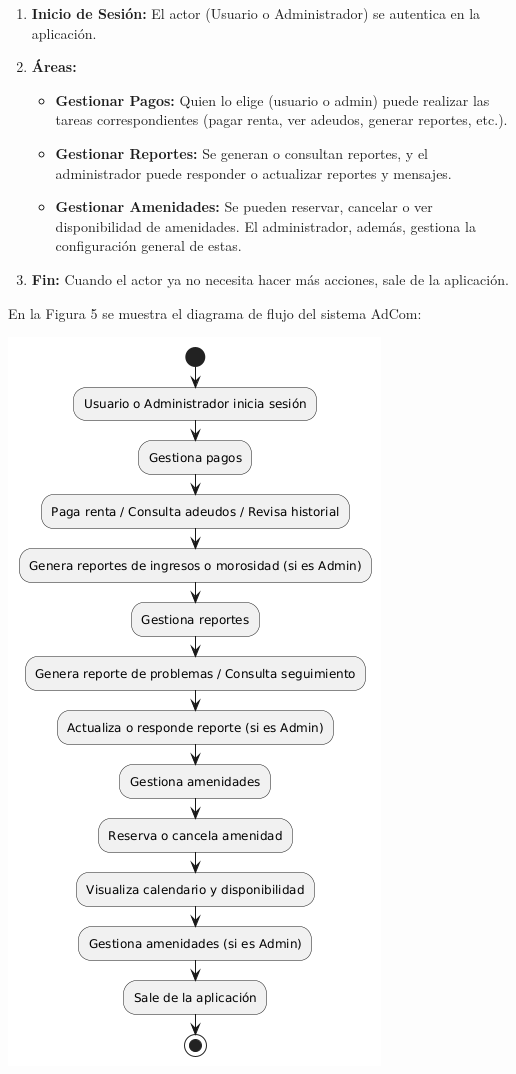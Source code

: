 \documentclass[protocolo.tex]{subfiles}
\begin{document}
\begin{enumerate}
    \item \textbf{Inicio de Sesión:}  
    El actor (Usuario o Administrador) se autentica en la aplicación.
    \item \textbf{Áreas:} 
    \begin{itemize}
        \item \textbf{Gestionar Pagos:}  Quien lo elige (usuario o admin) puede realizar las tareas correspondientes (pagar renta, ver adeudos, generar reportes, etc.).
        \item \textbf{Gestionar Reportes:}  Se generan o consultan reportes, y el administrador puede responder o actualizar reportes y mensajes.
        \item \textbf{Gestionar Amenidades:}  Se pueden reservar, cancelar o ver disponibilidad de amenidades. El administrador, además, gestiona la configuración general de estas.
    \end{itemize} 
    
    \item \textbf{Fin:}  
    Cuando el actor ya no necesita hacer más acciones, sale de la aplicación.

\end{enumerate}
En la Figura 5 se muestra el diagrama de flujo del sistema AdCom:\vspace{4mm}
\begin{center}
\includegraphics[scale=0.5]{Imagenes/Pdf/AdcomF.png}
\end{center}
\end{document}
